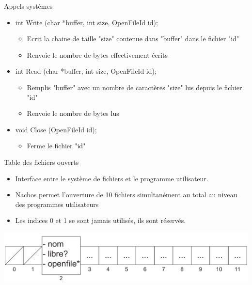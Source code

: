 \documentclass{beamer}
\begin{document}
\begin{frame}
	\begin{block}{Appels systèmes}
		\begin{itemize}
			\item<1-> int Write (char *buffer, int size, OpenFileId id);
			\begin{itemize}
				\item<1->Ecrit la chaine de taille "size" contenue dans "buffer" dans le fichier "id"
				\item<1->Renvoie le nombre de bytes effectivement écrits
			\end{itemize}
			\item<2-> int Read (char *buffer, int size, OpenFileId id);
			\begin{itemize}
				\item<1->Remplis "buffer" avec un nombre de caractères "size" lus depuis le fichier "id"
				\item<1->Renvoie le nombre de bytes lus
			\end{itemize}	
			\item<3-> void Close (OpenFileId id);
			\begin{itemize}
				\item<1->Ferme le fichier "id"
			\end{itemize}		
		\end{itemize}
	\end{block}
\end{frame}

\begin{frame}
	\begin{block}{Table des fichiers ouverts}
		\begin{itemize}
			\item<1-> Interface entre le système de fichiers et le programme utilisateur.
			\item<1-> Nachos permet l'ouverture de 10 fichiers simultanément au total au niveau des programmes utilisateurs
			\item<1-> Les indices 0 et 1 se sont jamais utilisés, ils sont réservés.
		\end{itemize}		
	\end{block}	
  	\begin{center}
	  	\includegraphics[scale=0.2]{images/FS2.png}
  	\end{center}	
\end{frame}
\end{document}
